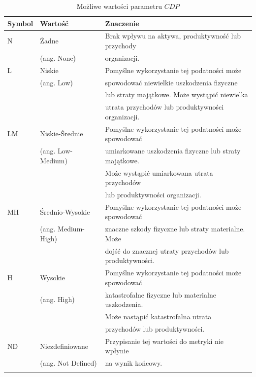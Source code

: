 \begin{table}[tbh]
\caption{Możliwe wartości parametru $CDP$}
\begin{center}
\label{tab:chapter2:cdp}
\begin{tabular}{lll}
\hline \noalign {\smallskip}
\textbf{Symbol} & \textbf{Wartość} & \textbf{Znaczenie}    \\
\hline \noalign {\smallskip}
N  & Żadne              & Brak wpływu na aktywa, produktywność lub przychody \\
   & (ang. None)        & organizacji.\\
\hline \noalign {\smallskip}
L  & Niskie             & Pomyślne wykorzystanie tej podatności może \\
   & (ang. Low)         & spowodować niewielkie  uszkodzenia fizyczne \\
   &                    & lub straty majątkowe. Może wystąpić niewielka \\
   &                    & utrata przychodów lub produktywności organizacji.\\
\hline \noalign {\smallskip}
LM & Niskie-Średnie     & Pomyślne wykorzystanie tej podatności może spowodować\\       
   & (ang. Low-Medium)  & umiarkowane uszkodzenia fizyczne lub straty majątkowe. \\
   &                    &  Może wystąpić umiarkowana utrata przychodów \\
   &                    & lub produktywności organizacji.\\
\hline \noalign {\smallskip}
MH & Średnio-Wysokie    & Pomyślne wykorzystanie tej podatności może spowodować \\
   & (ang. Medium-High) & znaczne szkody fizyczne lub straty materialne. Może \\
   &                    & dojść do znacznej utraty przychodów lub produktywności.\\
\hline \noalign {\smallskip}
H  & Wysokie            & Pomyślne wykorzystanie tej podatności może spowodować \\
   & (ang. High)        & katastrofalne fizyczne lub materialne uszkodzenia. \\ 
   &                    & Może nastąpić katastrofalna utrata  \\
   &                    & przychodów lub produktywności.\\
\hline \noalign {\smallskip}
ND &Niezdefiniowane     & Przypisanie tej wartości do metryki nie wpłynie \\
   & (ang. Not Defined) & na wynik końcowy. \\
\hline \noalign {\smallskip}
\end{tabular}
\end{center}
\end{table}

